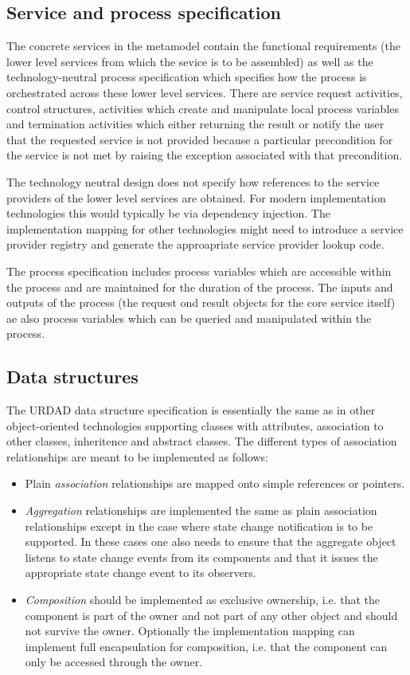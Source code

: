 \subsection{Service and process specification}

The concrete services in the metamodel contain the functional requirements (the lower level services from which the sevice is to be assembled) as well as the technology-neutral process specification which specifies how the process is orchestrated across these lower level services. There are service request activities, control structures, activities which create and manipulate local process variables and termination activities which either returning the result or notify the user that the requested service is not provided because a particular precondition for the service is not met by raising the exception associated with that precondition. 

The technology neutral design does not specify how references to the service providers of the lower level services are obtained. For modern implementation technologies this would typically be via dependency injection. The implementation mapping for other technologies might need to introduce a service provider registry and generate the approapriate service provider lookup code.

The process specification includes process variables which are accessible within the process and are maintained for the duration of the process. The inputs and outputs of the process (the request ond result objects for the core service itself) ae also process variables which can be queried and manipulated within the process.

\subsection{Data structures}

The URDAD data structure specification is essentially the same as in other object-oriented technologies supporting classes with attributes, association to other classes, inheritence and abstract classes. The different types of association relationships are meant to be implemented as follows:
\begin{itemize}
  \item Plain \textit{association} relationships are mapped onto simple references or pointers.
  \item \textit{Aggregation} relationships are implemented the same as plain association relationships except in the case where state change notification is to be supported. In these cases one also needs to ensure that the aggregate object listens to state change events from its components and that it issues the appropriate state change event to its observers.
  \item \textit{Composition} should be implemented as exclusive ownership, i.e. that the component is part of the owner and not part of any other object and should not survive the owner. Optionally the implementation mapping can implement full encapsulation for composition, i.e. that the component can only be accessed through the owner.
\end{itemize}


